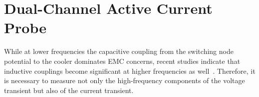 

\section{Dual-Channel Active Current Probe}
\label{ch:AShunt}

While at lower frequencies the capacitive coupling from the switching node potential to the cooler dominates EMC concerns, recent studies indicate that inductive couplings become significant at higher frequencies as well~\cite{hamami_identifying_2026}.
Therefore, it is necessary to measure not only the high-frequency components of the voltage transient but also of the current transient.



